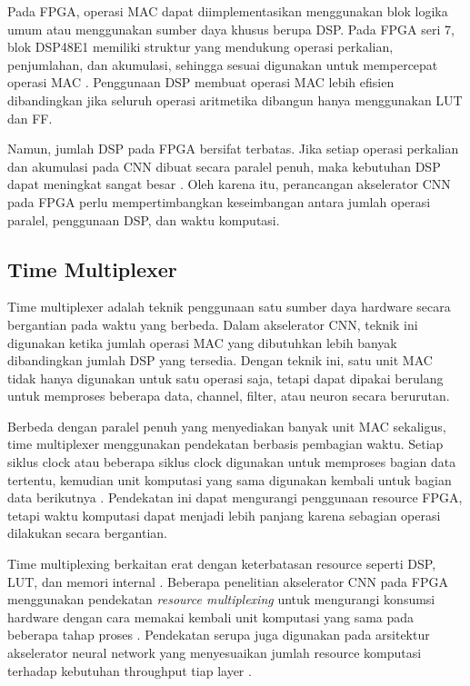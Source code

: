   Pada FPGA, operasi MAC dapat diimplementasikan menggunakan blok
  logika umum atau menggunakan sumber daya khusus berupa DSP. Pada FPGA
  seri 7, blok DSP48E1 memiliki struktur yang mendukung operasi perkalian,
  penjumlahan, dan akumulasi, sehingga sesuai digunakan untuk mempercepat
  operasi MAC \cite{Xilinx2018DSP48E1}. Penggunaan DSP membuat operasi
  MAC lebih efisien dibandingkan jika seluruh operasi aritmetika dibangun
  hanya menggunakan LUT dan FF.

  Namun, jumlah DSP pada FPGA bersifat terbatas. Jika setiap operasi
  perkalian dan akumulasi pada CNN dibuat secara paralel penuh, maka
  kebutuhan DSP dapat meningkat sangat besar \cite{Yan2022ResourceMultiplexingCNN}. Oleh karena itu,
  perancangan akselerator CNN pada FPGA perlu mempertimbangkan keseimbangan
  antara jumlah operasi paralel, penggunaan DSP, dan waktu komputasi.

  \subsection{Time Multiplexer}
  Time multiplexer adalah teknik penggunaan satu sumber daya hardware secara
  bergantian pada waktu yang berbeda. Dalam akselerator CNN,
  teknik ini digunakan ketika jumlah operasi MAC yang dibutuhkan lebih
  banyak dibandingkan jumlah DSP yang tersedia. Dengan teknik ini,
  satu unit MAC tidak hanya digunakan untuk satu operasi saja, tetapi
  dapat dipakai berulang untuk memproses beberapa data, channel,
  filter, atau neuron secara berurutan.

  Berbeda dengan paralel penuh yang menyediakan banyak unit MAC
  sekaligus, time multiplexer menggunakan pendekatan berbasis
  pembagian waktu. Setiap siklus clock atau beberapa siklus clock
  digunakan untuk memproses bagian data tertentu, kemudian unit
  komputasi yang sama digunakan kembali untuk bagian data berikutnya \cite{Zhang2015OptimizingCNNFPGA, Dua2020SystolicCNN, Umuroglu2017FINN}.
  Pendekatan ini dapat mengurangi penggunaan resource FPGA,
  tetapi waktu komputasi dapat menjadi lebih panjang karena
  sebagian operasi dilakukan secara bergantian.

  Time multiplexing berkaitan erat dengan keterbatasan resource
  seperti DSP, LUT, dan memori internal \cite{amd2023dsp68595}. Beberapa penelitian
  akselerator CNN pada FPGA menggunakan pendekatan \emph{resource multiplexing} untuk mengurangi
  konsumsi hardware dengan cara memakai kembali unit komputasi
  yang sama pada beberapa tahap proses \cite{Yan2022ResourceMultiplexingCNN}.
  Pendekatan serupa juga digunakan pada arsitektur akselerator neural network
  yang menyesuaikan jumlah resource komputasi terhadap kebutuhan
  throughput tiap layer \cite{Umuroglu2017FINN}.

